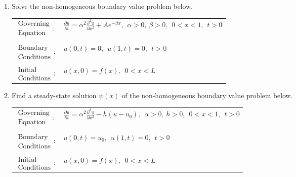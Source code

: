 \begin{fullwidth}
\begin{enumerate}
\vspace{2.0cm}

\item Solve the non-homogeneous boundary value problem below.
\begin{table}
\begin{tabular}{l l}
$\substack{\text{Governing} \\\text{Equation}}: $& $\frac{\partial u}{\partial t} = \alpha^2 \frac{\partial^2 u}{\partial x^2} + Ae^{-\beta x}, \ \ \alpha>0, \ \beta>0, \ \ 0<x<1, \ \ t>0$ \\
& \\
$\substack{\text{Boundary} \\ \text{Conditions}}: $& $u(0,t)=0, \ \ u(1,t) = 0, \ \ t>0$\\
& \\
$\substack{\text{Initial} \\ \text{Conditions}}: $ & $u(x,0) = f(x), \ \ 0<x<L $ \\
\end{tabular}
\end{table}

\vspace{2.0cm}

\item Find a steady-state solution $\psi(x)$ of the non-homogeneous boundary value problem below.

\begin{table}
\begin{tabular}{l l}
$\substack{\text{Governing} \\\text{Equation}}: $& $\frac{\partial u}{\partial t} = \alpha^2 \frac{\partial^2 u}{\partial x^2} -h(u-u_0), \ \ \alpha>0, \ h>0, \ \ 0<x<1, \ \ t>0$ \\
& \\
$\substack{\text{Boundary} \\ \text{Conditions}}: $& $u(0,t)=u_0, \ \ u(1,t) = 0, \ \ t>0$\\
& \\
$\substack{\text{Initial} \\ \text{Conditions}}: $ & $u(x,0) = f(x), \ \ 0<x<L $ \\
\end{tabular}
\end{table}

\vspace{2.0cm}


\end{enumerate}
\end{fullwidth}
